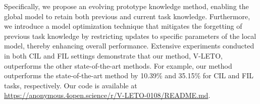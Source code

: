 Specifically, we propose an evolving prototype knowledge method, enabling the global model to retain both previous and current task knowledge. 
Furthermore, we introduce a model optimization technique that mitigates the forgetting of previous task knowledge by restricting updates to specific parameters of the local model, thereby enhancing overall performance.
Extensive experiments conducted in both CIL and FIL settings demonstrate that our method, V-LETO, outperforms the other state-of-the-art methods. 
For example, our method outperforms the state-of-the-art method by 10.39\% and 35.15\% for CIL and FIL tasks, respectively.
Our code is available at \url{https://anonymous.4open.science/r/V-LETO-0108/README.md}.
